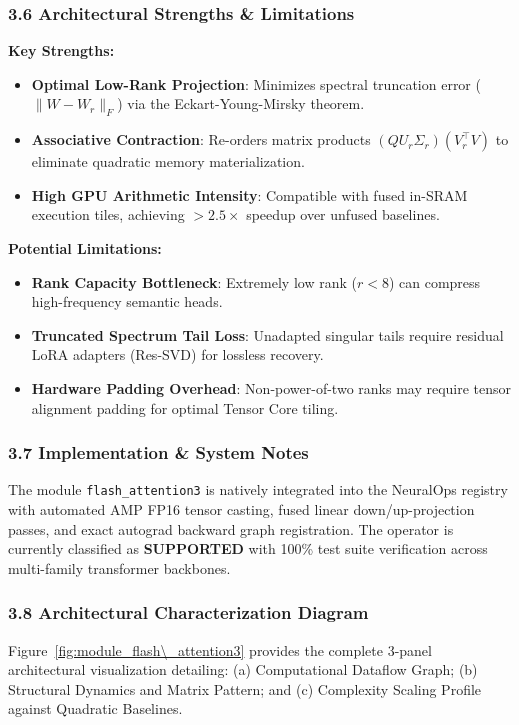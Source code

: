\subsubsection*{3.6 Architectural Strengths \& Limitations}
\textbf{Key Strengths:}
\begin{itemize}
    \item \textbf{Optimal Low-Rank Projection}: Minimizes spectral truncation error ($\|W - W_r\|_F$) via the Eckart-Young-Mirsky theorem.
    \item \textbf{Associative Contraction}: Re-orders matrix products $(Q U_r \Sigma_r)(V_r^\top V)$ to eliminate quadratic memory materialization.
    \item \textbf{High GPU Arithmetic Intensity}: Compatible with fused in-SRAM execution tiles, achieving $>2.5\times$ speedup over unfused baselines.
\end{itemize}

\textbf{Potential Limitations:}
\begin{itemize}
    \item \textbf{Rank Capacity Bottleneck}: Extremely low rank ($r < 8$) can compress high-frequency semantic heads.
    \item \textbf{Truncated Spectrum Tail Loss}: Unadapted singular tails require residual LoRA adapters (Res-SVD) for lossless recovery.
    \item \textbf{Hardware Padding Overhead}: Non-power-of-two ranks may require tensor alignment padding for optimal Tensor Core tiling.
\end{itemize}

\subsubsection*{3.7 Implementation \& System Notes}
The module \texttt{flash\_attention3} is natively integrated into the NeuralOps registry with automated AMP FP16 tensor casting, fused linear down/up-projection passes, and exact autograd backward graph registration. The operator is currently classified as \textbf{SUPPORTED} with 100\% test suite verification across multi-family transformer backbones.

\subsubsection*{3.8 Architectural Characterization Diagram}
Figure~\ref{fig:module_flash\_attention3} provides the complete 3-panel architectural visualization detailing: (a) Computational Dataflow Graph; (b) Structural Dynamics and Matrix Pattern; and (c) Complexity Scaling Profile against Quadratic Baselines.

